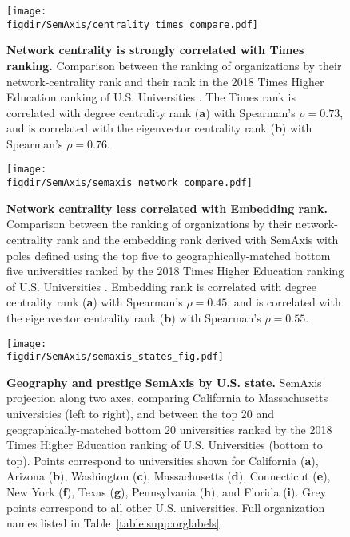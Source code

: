 \documentclass[12pt]{article} %
\def\figdir{../Figs}
\begin{document}
%
%
\begin{figure}[hp!]
	\centering
	\texttt{[image: \\figdir/SemAxis/centrality\_times\_compare.pdf]}
	\caption{
		\textbf{Network centrality is strongly correlated with Times ranking.}
		Comparison between the ranking of organizations by their network-centrality rank and their rank in the 2018 Times Higher Education ranking of U.S. Universities .
		The Times rank is correlated with degree centrality rank (\textbf{a}) with Spearman's $\rho = 0.73$, and is correlated with the eigenvector centrality rank (\textbf{b}) with Spearman's $\rho = 0.76$.
	}
	\label{fig:supp:centrality_times_compare}
\end{figure}



%
%
\begin{figure}[hp!]
	\centering
	\texttt{[image: \\figdir/SemAxis/semaxis\_network\_compare.pdf]}
	\caption{
		\textbf{Network centrality less correlated with Embedding rank.}
		Comparison between the ranking of organizations by their network-centrality rank and the embedding rank derived with SemAxis with poles defined using the top five to geographically-matched bottom five universities ranked by the 2018 Times Higher Education ranking of U.S. Universities .
		Embedding rank is correlated with degree centrality rank (\textbf{a}) with Spearman's $\rho = 0.45$, and is correlated with the eigenvector centrality rank (\textbf{b}) with Spearman's $\rho = 0.55$.
	}
	\label{fig:supp:centrality_semaxis_compare}
\end{figure}


%
%
\begin{figure}[hp!]
	\centering
	\texttt{[image: \\figdir/SemAxis/semaxis\_states\_fig.pdf]}
	\caption{
		\textbf{Geography and prestige SemAxis by U.S. state.}
		SemAxis projection along two axes, comparing California to Massachusetts universities (left to right), and between the top 20 and geographically-matched bottom 20 universities ranked by the 2018 Times Higher Education ranking of U.S. Universities (bottom to top).
		Points correspond to universities shown for California (\textbf{a}), Arizona (\textbf{b}), Washington (\textbf{c}), Massachusetts (\textbf{d}), Connecticut (\textbf{e}), New York (\textbf{f}), Texas (\textbf{g}), Pennsylvania (\textbf{h}), and Florida (\textbf{i}).
		Grey points correspond to all other U.S. universities.
		Full organization names listed in Table~\ref{table:supp:orglabels}.
	}
	\label{fig:supp:semaxis_states}
\end{figure}
\end{document}
